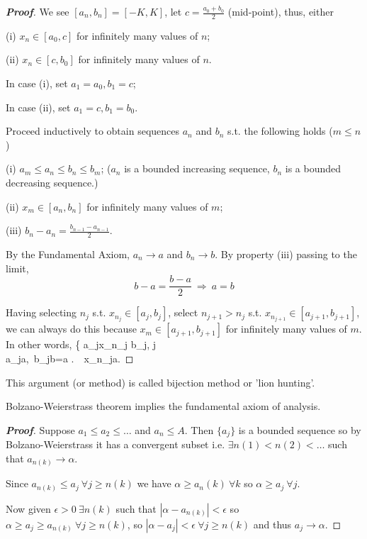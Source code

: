 \begin{proof}[{\bf Proof}]
We see $[a_n,b_n] = [-K,K]$, let $c=\frac{a_0+b_0}{2}$ (mid-point), thus, either
\ben
\item [(i)] $x_n\in[a_0,c]$ for infinitely many values of $n$;
\item [(ii)] $x_n\in[c,b_0]$ for infinitely many values of $n$.
\een

In case (i), set $a_1=a_0, b_1=c$;

In case (ii), set $a_1=c,b_1=b_0$.

Proceed inductively to obtain sequences $a_n$ and $b_n$ s.t. the following holds ($m\leq n$)

\ben
\item [(i)] $a_m\leq a_n\leq b_n\leq b_m$; ($a_n$ is a bounded increasing sequence, $b_n$ is a bounded decreasing sequence.)
\item [(ii)] $x_m\in[a_n,b_n]$ for infinitely many values of $m$;
\item [(iii)] $b_n-a_n=\frac{b_{n-1}-a_{n-1}}{2}$.
\een

By the Fundamental Axiom, $a_n\to a$ and $b_n\to b$. By property (iii) passing to the limit,
\begin{equation*}
b-a = \frac{b-a}{2}\ \Rightarrow \ a=b
\end{equation*}

Having selecting $n_j$ s.t. $x_{n_j}\in[a_j,b_j]$, select $n_{j+1}>n_j$ s.t. $x_{n_{j+1}}\in[a_{j+1},b_{j+1}]$, we can always do this because $x_m\in[a_{j+1},b_{j+1}]$ for infinitely many values of $m$. In other words,
\be
\left\{
a_j\leq x_{n_j} \leq b_j, \forall j\\
a_j\to a,\ b_j\to b=a
\ea\right.\ \Rightarrow \ x_{n_j}\to a.
\ee
\end{proof}

\begin{remark}
This argument (or method) is called bijection method or 'lion hunting'.
\end{remark}

\begin{theorem}\label{thm:bolzano_weierstrass_implies_fundamental_axiom_of_analysis}
Bolzano-Weierstrass theorem implies the fundamental axiom of analysis.
\end{theorem}

\begin{proof}[\bf Proof]
Suppose $a_1 \leq a_2 \leq \ldots$ and $a_n \leq A$. Then $\{a_j\}$ is a bounded sequence so by Bolzano-Weierstrass it has a convergent subset i.e. $\exists n(1) < n(2) < \ldots$ such that $a_{n(k)} \rightarrow \alpha$.

Since $a_{n(k)} \leq a_j \ \forall j \geq n(k)$ we have $\alpha \geq a_n(k) \ \forall k$ so $\alpha \geq a_j \ \forall j$.

Now given $\epsilon > 0 \ \exists n(k)$ such that $|\alpha - a_{n(k)}| < \epsilon$ so $\alpha \geq a_j \geq a_{n(k)} \ \forall j \geq n(k)$, so $|\alpha - a_j| < \epsilon \ \forall j \geq n(k)$ and thus $a_j \rightarrow \alpha$.
\end{proof}

